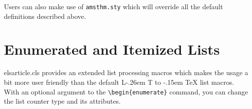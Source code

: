 \documentclass[a4paper,12pt]{article}
\makeatletter
\def\file#1{\textsf{#1}\xspace}
\DeclareRobustCommand{\LaTeX}{L\kern-.26em%
        {\sbox\z@ T%
         \vbox to\ht\z@{\hbox{\check@mathfonts
           \fontsize\sf@size\z@
           \math@fontsfalse\selectfont
          A\,}%
         \vss}%
        }%
     \kern-.15em%
    \TeX}
\makeatother
\begin{document}
Users can also make use of \verb+amsthm.sty+ which will override
all the default definitions described above.

\section{Enumerated and Itemized Lists}
\hypertarget{lists}{}
\file{elsarticle.cls} provides an extended list processing macros
which makes the usage a bit more user friendly than the default
\LaTeX{} list macros.   With an optional argument to the
\verb+\begin{enumerate}+ command, you can change the list counter
type and its attributes.


\end{document}
